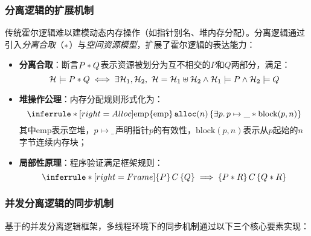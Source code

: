 \subsubsection{分离逻辑的扩展机制}
传统霍尔逻辑难以建模动态内存操作（如指针别名、堆内存分配）。分离逻辑\cite{reynolds2002separation}通过引入\emph{分离合取}（$\ast$）与\emph{空间资源模型}，扩展了霍尔逻辑的表达能力：
\begin{itemize}
    \item \textbf{分离合取}：断言$P \ast Q$表示资源被划分为互不相交的$P$和$Q$两部分，满足：
    \begin{equation}
        \mathcal{H} \models P \ast Q \iff \exists \mathcal{H}_1, \mathcal{H}_2,\ \mathcal{H} = \mathcal{H}_1 \uplus \mathcal{H}_2 \land \mathcal{H}_1 \models P \land \mathcal{H}_2 \models Q
    \end{equation}
    
    \item \textbf{堆操作公理}：内存分配规则形式化为：
    \begin{equation}
        \inferrule*[right=Alloc]{
            \mathrm{emp}
        }{
            \hoare{\mathrm{emp}}{\mathtt{alloc}(n)}{\exists p.\, p \mapsto \_ \ast \mathrm{block}(p, n)}
        }
        \end{equation}
    其中$\mathrm{emp}$表示空堆，$p \mapsto \_\,$声明指针$p$的有效性，$\mathrm{block}(p, n)$表示从$p$起始的$n$字节连续内存块；
    
    \item \textbf{局部性原理}：程序验证满足框架规则：
    \begin{equation}
        \inferrule*[right=Frame]{}{\hoare{P}{C}{Q} \implies \hoare{P \sepcon R}{C}{Q \sepcon R}}
    \end{equation}
\end{itemize}

\subsubsection{并发分离逻辑的同步机制}
\label{subsubsec:concurrent-logic}

基于\cite{brookes2007concurrent}的并发分离逻辑框架，多线程环境下的同步机制通过以下三个核心要素实现：

